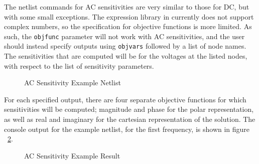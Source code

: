 The netlist commands for AC sensitivities are very similar to those for DC, but with 
some small exceptions.   The expression library in \Xyce{} currently does not support
complex numbers, so the specification for objective functions is more limited.  As such, 
the \texttt{objfunc} parameter will not work with AC sensitivities, and the user should
instead specify outputs using \texttt{objvars} followed by a list of node names.  The
sensitivities that are computed will be for the voltages at the listed nodes, with respect
to the list of sensitivity parameters.
\begin{figure}[htbp]
  \begin{centering}
\caption[AC Sensitivity Example Netlist]
{AC Sensitivity Example Netlist \label{AC_Sensitivity_Netlist} }
\end{centering}
\end{figure}
For each specified output, there are four separate objective functions for
which sensitivities will be computed; magnitude and phase for the polar 
representation, as well as real and imaginary for the cartesian 
representation of the solution.   The console output for the example netlist,
for the first frequency, is shown in figure ~\ref{AC_Sensitivity_Result}.
\begin{figure}[htbp]
  \begin{centering}
\caption[AC Sensitivity Example Result]
{AC Sensitivity Example Result\label{AC_Sensitivity_Result} }
\end{centering}
\end{figure}

